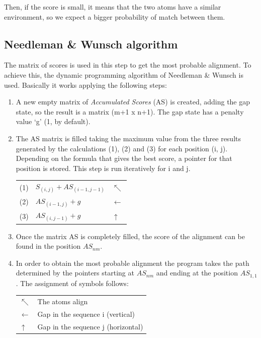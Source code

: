 \documentclass{article}
\begin{document}
Then, if the score is small, it means that the two atoms have a similar environment, so we expect a bigger probability of match between them.


\subsection*{\color{gray}Needleman \& Wunsch algorithm}
The matrix of scores is used in this step to get the most probable alignment. To achieve this, the dynamic programming algorithm of Needleman \& Wunsch is used\cite{12}. Basically it works applying the following steps:

\begin{enumerate}
	\item A new empty matrix of \textit{Accumulated Scores} (AS) is created, adding the gap state, so the result is a matrix  (m+1 x n+1). The gap state has a penalty value `g' (1, by default).
	\item The AS matrix is filled taking the maximum value from the three results generated by the calculations (1), (2) and (3) for each position (i, j). Depending on the formula that gives the best score, a pointer for that position is stored. This step is run iteratively for i and j.
	
	\begin{center}
	\begin{tabular}{ |l|l|l| }
	\hline
	    (1)& $S_{(i,j)}+AS_{(i-1, j-1)}$ &$\nwarrow$ \\
	    (2)& $AS_{(i-1, j)}+g$ & $\leftarrow$ \\
	    (3)& $AS_{(i, j-1)}+g$ & $\uparrow$ \\   
	\hline
	\end{tabular}
	\end{center}
	
	\item Once the matrix AS is completely filled, the score of the alignment can be found in the position $AS_{nm}$. 
	\item In order to obtain the most probable alignment the program takes the path determined by the pointers starting at $AS_{nm}$ and ending at the position $AS_{1,1}$. The assignment of symbols follows:
	\begin{center}
		\begin{tabular}{ |l|l| }
		\hline
		   	$\nwarrow$ & The atoms align\\
		    $\leftarrow$ & Gap in the sequence i (vertical)\\
		    $\uparrow$ & Gap in the sequence j (horizontal)\\   
		\hline
		\end{tabular}
	\end{center}
\end{enumerate}
\end{document}
